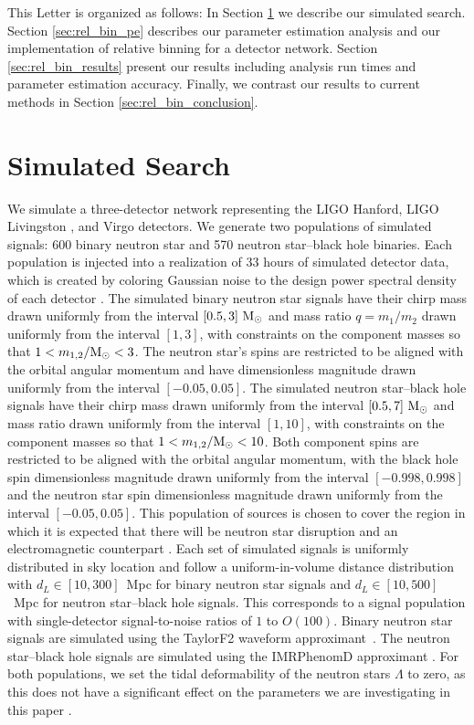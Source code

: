 This Letter is organized as follows: In Section \ref{sec:search} we describe our simulated search. Section \ref{sec:rel_bin_pe} describes our parameter estimation analysis and our implementation of relative binning for a detector network. Section \ref{sec:rel_bin_results} present our results including analysis run times and parameter estimation accuracy. Finally, we contrast our results to current methods in Section \ref{sec:rel_bin_conclusion}.

\section{Simulated Search}\label{sec:search}
We simulate a three-detector network representing the LIGO Hanford, LIGO Livingston \cite{TheLIGOScientific:2016agk,Buikema:2020dlj}, and Virgo \cite{TheVirgo:2014hva} detectors. We generate two populations of simulated signals: 600 binary neutron star and 570 neutron star--black hole binaries. Each population is injected into a realization of 33 hours of simulated detector data, which is created by coloring Gaussian noise to the design power spectral density of each detector \cite{Aasi:2013wya}. The simulated binary neutron star signals have their chirp mass drawn uniformly from the interval $[0.5, 3]~\mathrm{M}_{\odot}$ and mass ratio $q=m_1/m_2$ drawn uniformly from the interval $[1, 3]$, with constraints on the component masses so that $1 < m_{1,2}/\mathrm{M}_{\odot} < 3$. The neutron star's spins are restricted to be aligned with the orbital angular momentum and have dimensionless magnitude drawn uniformly from the interval $[-0.05, 0.05]$. The simulated neutron star--black hole signals have their chirp mass drawn uniformly from the interval $[0.5, 7]~\mathrm{M}_{\odot}$ and mass ratio drawn uniformly from the interval $[1, 10]$, with constraints on the component masses so that $1 < m_{1,2}/\mathrm{M}_{\odot} < 10$. Both component spins are restricted to be aligned with the orbital angular momentum, with the black hole spin dimensionless magnitude drawn uniformly from the interval $[-0.998, 0.998]$ and the neutron star spin dimensionless magnitude drawn uniformly from the interval $[-0.05, 0.05]$. This population of sources is chosen to cover the region in which it is expected that there will be neutron star disruption and an electromagnetic counterpart \cite{Capano:2019eae}. Each set of simulated signals is uniformly distributed in sky location and follow a uniform-in-volume distance distribution with $d_{L}\in[10, 300]$~Mpc for binary neutron star signals and $d_{L}\in[10, 500]$~Mpc for neutron star--black hole signals. This corresponds to a signal population with single-detector signal-to-noise ratios of $1$ to $O(100)$. Binary neutron star signals are simulated using the TaylorF2 waveform approximant~\cite{Dhurandhar:1992mw,Droz:1999qx,Blanchet:1995ez,Faye:2012we}. The neutron star--black hole signals are simulated using the IMRPhenomD approximant \cite{Husa:2015iqa,Khan:2015jqa}. For both populations, we set the tidal deformability of the neutron stars $\Lambda$ to zero, as this does not have a significant effect on the parameters we are investigating in this paper \cite{Damour:2012yf}.

